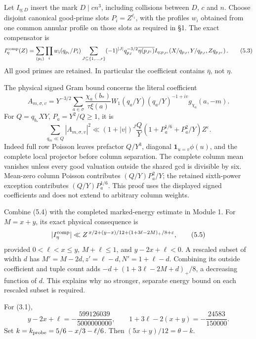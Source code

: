 \documentclass[11pt,a4paper]{article}
\begin{document}
Let \(I_{\eta;D}\) insert the mark \(D\mid cn^3\), including collisions
between \(D\), \(c\) and \(n\). Choose disjoint canonical good-prime
slots \(P_i=Z^{\ell_i}\), with the profiles \(w_i\) obtained from one
common annular profile on those slots as required in §1. The exact
compensator is \[
I_\eta^{\rm comp}(Z)=\sum_{(p_i)}\prod_iw_i(q_{p_i}/P_i)
 \sum_{J\subseteq\{1,\ldots,r\}}(-1)^{|J|}
 q_{p_J}^{-3/2}\overline{\eta(p_{J^c})}
 I_{\eta;p_{J^c}}\!\left(X/q_{p_J},Y/q_{p_J},Zq_{p_{J^c}}\right).
\tag{5.3}
\] All good primes are retained. In particular the coefficient contains
\(\overline\eta\), not \(\eta\).

The physical signed Gram bound concerns the literal coefficient \[
A_{m,\sigma,v}
=Y^{-3/2}\sum_{a\in\sigma}
 \frac{\chi_a(b_*)}{\tau\xi(a)}
 W_1(q_a/Y)(q_a/Y)^{-1+iv}g_{\chi_a}(a,-m).
\] For \(Q=q_{b_*}XY\), \(P_a=Y^2/Q\ge1\), it is \[
\sum_{q_m\ll Q}|A_{m,\sigma,v}|^2
\ll(1+|v|)^J\frac QY(1+P_a^{1/6}+P_a^2/Y)Z^\varepsilon.
\tag{5.4}
\] Indeed full row Poisson leaves prefactor \(Q/Y^3\), diagonal
\(\mathbf1_{u=v}\phi(u)\), and the complete local projector before
column separation. The complete column mean vanishes unless every good
valuation outside the shared gcd is divisible by six. Mean-zero column
Poisson contributes \((Q/Y)P_a^2/Y\); the retained sixth-power exception
contributes \((Q/Y)P_a^{1/6}\). This proof uses the displayed signed
coefficients and does not extend to arbitrary column weights.

Combine (5.4) with the completed marked-energy estimate in Module 1. For
\(M=x+y\), its exact physical consequence is \[
|I_\eta^{\rm comp}|
\ll Z^{\,x/2+(y-x)/12+(1+3\ell-2M)_+/8+\varepsilon},
\tag{5.5}
\] provided \(0<\ell<x\le y\), \(M+\ell\le1\), and \(y-2x+\ell<0\). A
rescaled subset of width \(d\) has \(M'=M-2d,z'=\ell-d,N'=1+\ell-d\).
Combining its outside coefficient and tuple count adds
\(-d+(1+3\ell-2M+d)_+/8\), a decreasing function of \(d\). This explains
why no stronger, separate energy bound on each rescaled subset is
required.

For (3.1), \[
y-2x+\ell=-\frac{599126039}{5000000000},\qquad
1+3\ell-2(x+y)=-\frac{24583}{150000}.
\tag{5.6}
\] Set \(k=k_{\rm probe}=5/6-x/3-\ell/6\). Then \((5x+y)/12=\theta-k\).
\end{document}
